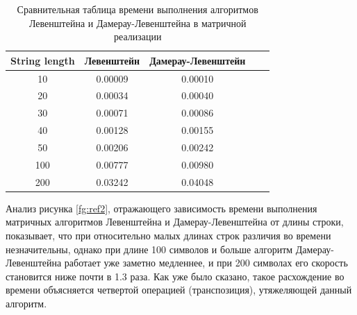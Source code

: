 \documentclass[12pt]{report}
\begin{document}
\begin{table}[ht]
	\centering
	\caption{Сравнительная таблица времени выполнения алгоритмов Левенштейна и Дамерау-Левенштейна в матричной реализации}
	\begin{tabular}{|c c c c c|}
		\hline
		\hline
		String length & Левенштейн & Дамерау-Левенштейн \\ [0.5ex] 
 		\hline\hline
		10 & 0.00009 & 0.00010\\
 		\hline
 		20 & 0.00034 & 0.00040\\
 		\hline
 		30 & 0.00071 & 0.00086\\
 		\hline
		40 & 0.00128 & 0.00155\\
		\hline
		50 & 0.00206 & 0.00242\\
		\hline
		100 & 0.00777 & 0.00980\\
		\hline
		200 & 0.03242 & 0.04048\\
		\hline
		\end{tabular}
	\label{table:ref2}
\end{table} 

\begin{figure}[ht!]
\end{figure}


Анализ рисунка \ref{fg:ref2}, отражающего зависимость времени выполнения матричных алгоритмов Левенштейна и Дамерау-Левенштейна от длины строки, показывает, что при относительно малых длинах строк различия во времени незначительны, однако при длине 100 символов и больше алгоритм Дамерау-Левенштейна 
работает уже заметно медленнее, и при 200 символах его скорость становится ниже почти в 1.3 раза. Как уже было сказано, такое расхождение во времени объясняется четвертой операцией (транспозиция), утяжеляющей данный алгоритм.
\end{document}
